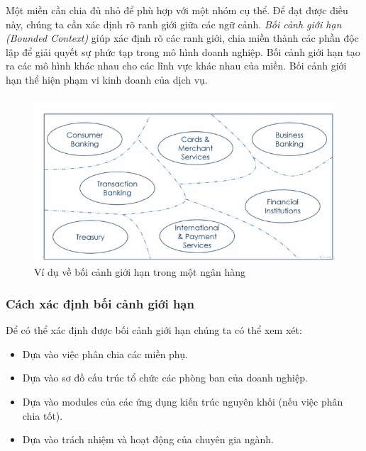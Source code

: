 Một miền cần chia đủ nhỏ để phù hợp với một nhóm cụ thể. Để đạt được điều này, chúng ta cần xác định rõ ranh giới giữa các ngữ cảnh. \emph{Bối cảnh giới hạn (Bounded Context)} giúp xác định rõ các ranh giới, chia miền thành các phần độc lập để giải quyết sự phức tạp trong mô hình doanh nghiệp. Bối cảnh giới hạn tạo ra các mô hình khác nhau cho các lĩnh vực khác nhau của miền. Bối cảnh giới hạn thể hiện phạm vi kinh doanh của dịch vụ.

\begin{figure}[H]

\centering

\includegraphics[scale = 1]{pictures/boi_canh_gioi_han/main.png}

\caption{Ví dụ về bối cảnh giới hạn trong một ngân hàng}

\end{figure}

\subsubsection{Cách xác định bối cảnh giới hạn}

Để có thể xác định được bối cảnh giới hạn chúng ta có thể xem xét:

\begin{itemize}

\item Dựa vào việc phân chia các miền phụ.

\item Dựa vào sơ đồ cấu trúc tổ chức các phòng ban của doanh nghiệp.

\item Dựa vào modules của các ứng dụng kiến trúc nguyên khối (nếu việc phân chia tốt).

\item Dựa vào trách nhiệm và hoạt động của chuyên gia ngành.

\end{itemize}


